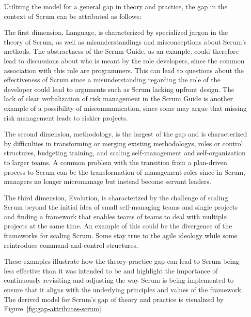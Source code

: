 Utilizing the model for a general gap in theory and practice, the gap in the context of Scrum can be attributed as follows:

The first dimension, Language, is characterized by specialized jargon in the theory of Scrum, as well as misunderstandings and misconceptions about Scrum's \glspl{method}. The abstractness of the Scrum Guide, as an example, could therefore lead to discussions about who is meant by the role \glspl{developer}, since the common association with this role are programmers. This can lead to questions about the effectiveness of Scrum since a misunderstanding regarding the role of the \gls{developer} could lead to arguments such as Scrum lacking upfront design. The lack of clear verbalization of risk management in the Scrum Guide is another example of a possibility of miscommunication, since some may argue that missing risk management leads to riskier projects. 

The second dimension, \Gls{methodology}, is the largest of the gap and is characterized by difficulties in transforming or merging existing \glspl{methodology}, roles or control structures, budgeting training, and scaling self-management and self-organization to larger teams. A common problem with the \gls{transition} from a \gls{plan-driven} process to Scrum can be the \gls{transformation} of management roles since in Scrum, managers no longer micromanage but instead become servant leaders.

The third dimension, Evolution, is characterized by the challenge of scaling Scrum beyond the initial idea of small \gls{self-managing} teams and single projects and finding a \gls{framework} that enables teams of teams to deal with multiple projects at the same time. An example of this could be the divergence of the \glspl{framework} for scaling Scrum. Some stay true to the \gls{agile} \gls{ideology} while some reintroduce command-and-control structures.

These examples illustrate how the theory-practice gap can lead to Scrum being less effective than it was intended to be and highlight the importance of continuously revisiting and adjusting the way Scrum is being implemented to ensure that it aligns with the underlying \glspl{principle} and values of the \gls{framework}.\newline
The derived model for Scrum's gap of theory and practice is visualized by Figure~\ref{fig:gap-attributes-scrum}.

